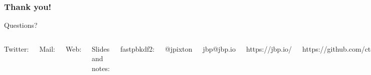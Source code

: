 \documentclass[aspectratio=169]{beamer}
\begin{document}
\frame
{
  \frametitle{Thank you!}
  Questions?

  \vspace{5em}

  \begin{columns}[c]
      Twitter:

      Mail:

      Web:

      Slides and notes:

      fastpbkdf2:

      @jpixton

      jbp@jbp.io

      https://jbp.io/

      https://github.com/ctz/talks/

      https://github.com/ctz/fastpbkdf2/
  \end{columns}

%
%
%
%
}
\end{document}
